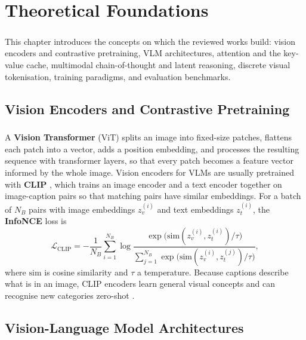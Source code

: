 \documentclass[12pt,a4paper,final]{extreport}
\begin{document}
\chapter{Theoretical Foundations}

\paragraph{} This chapter introduces the concepts on which the reviewed works build: vision encoders and contrastive pretraining, VLM architectures, attention and the key-value cache, multimodal chain-of-thought and latent reasoning, discrete visual tokenisation, training paradigms, and evaluation benchmarks.

\section{Vision Encoders and Contrastive Pretraining}

\paragraph{} A \textbf{Vision Transformer} (ViT) \cite{dosovitskiy2021} splits an image into fixed-size patches, flattens each patch into a vector, adds a position embedding, and processes the resulting sequence with transformer layers, so that every patch becomes a feature vector informed by the whole image. Vision encoders for VLMs are usually pretrained with \textbf{CLIP} \cite{radford2021}, which trains an image encoder and a text encoder together on image-caption pairs so that matching pairs have similar embeddings. For a batch of $N_B$ pairs with image embeddings $z_v^{(i)}$ and text embeddings $z_t^{(i)}$, the \textbf{InfoNCE} loss is
\begin{equation}
\mathcal{L}_{\mathrm{CLIP}}=-\frac{1}{N_B}\sum_{i=1}^{N_B}\log\frac{\exp\big(\mathrm{sim}(z_v^{(i)},z_t^{(i)})/\tau\big)}{\sum_{j=1}^{N_B}\exp\big(\mathrm{sim}(z_v^{(i)},z_t^{(j)})/\tau\big)},
\end{equation}
where $\mathrm{sim}$ is cosine similarity and $\tau$ a temperature. Because captions describe what is in an image, CLIP encoders learn general visual concepts and can recognise new categories zero-shot \cite{p4}.

\section{Vision-Language Model Architectures}
\end{document}
